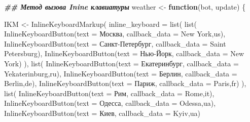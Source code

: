 \documentclass[
]{book}
\newenvironment{Shaded}{\begin{snugshade}}{\end{snugshade}}
\newcommand{\AttributeTok}[1]{\textcolor[rgb]{0.77,0.63,0.00}{#1}}
\newcommand{\ControlFlowTok}[1]{\textcolor[rgb]{0.13,0.29,0.53}{\textbf{#1}}}
\newcommand{\DocumentationTok}[1]{\textcolor[rgb]{0.56,0.35,0.01}{\textbf{\textit{#1}}}}
\newcommand{\FunctionTok}[1]{\textcolor[rgb]{0.00,0.00,0.00}{#1}}
\newcommand{\NormalTok}[1]{#1}
\newcommand{\OtherTok}[1]{\textcolor[rgb]{0.56,0.35,0.01}{#1}}
\newcommand{\StringTok}[1]{\textcolor[rgb]{0.31,0.60,0.02}{#1}}
\begin{document}
\begin{Shaded}
\begin{Highlighting}[]
\DocumentationTok{\#\# Метод вызова Inine клавиатуры}
\NormalTok{weather }\OtherTok{\textless{}{-}} \ControlFlowTok{function}\NormalTok{(bot, update) \{}

\NormalTok{  IKM }\OtherTok{\textless{}{-}} \FunctionTok{InlineKeyboardMarkup}\NormalTok{(}
    \AttributeTok{inline\_keyboard =} \FunctionTok{list}\NormalTok{(}
      \FunctionTok{list}\NormalTok{(}
        \FunctionTok{InlineKeyboardButton}\NormalTok{(}\AttributeTok{text =} \StringTok{\textquotesingle{}Москва\textquotesingle{}}\NormalTok{, }\AttributeTok{callback\_data =} \StringTok{\textquotesingle{}New York,us\textquotesingle{}}\NormalTok{),}
        \FunctionTok{InlineKeyboardButton}\NormalTok{(}\AttributeTok{text =} \StringTok{\textquotesingle{}Санкт{-}Петербург\textquotesingle{}}\NormalTok{, }\AttributeTok{callback\_data =} \StringTok{\textquotesingle{}Saint Petersburg\textquotesingle{}}\NormalTok{),}
        \FunctionTok{InlineKeyboardButton}\NormalTok{(}\AttributeTok{text =} \StringTok{\textquotesingle{}Нью{-}Йорк\textquotesingle{}}\NormalTok{, }\AttributeTok{callback\_data =} \StringTok{\textquotesingle{}New York\textquotesingle{}}\NormalTok{)}
\NormalTok{      ),}
      \FunctionTok{list}\NormalTok{(}
        \FunctionTok{InlineKeyboardButton}\NormalTok{(}\AttributeTok{text =} \StringTok{\textquotesingle{}Екатеринбург\textquotesingle{}}\NormalTok{, }\AttributeTok{callback\_data =} \StringTok{\textquotesingle{}Yekaterinburg,ru\textquotesingle{}}\NormalTok{),}
        \FunctionTok{InlineKeyboardButton}\NormalTok{(}\AttributeTok{text =} \StringTok{\textquotesingle{}Берлин\textquotesingle{}}\NormalTok{, }\AttributeTok{callback\_data =} \StringTok{\textquotesingle{}Berlin,de\textquotesingle{}}\NormalTok{),}
        \FunctionTok{InlineKeyboardButton}\NormalTok{(}\AttributeTok{text =} \StringTok{\textquotesingle{}Париж\textquotesingle{}}\NormalTok{, }\AttributeTok{callback\_data =} \StringTok{\textquotesingle{}Paris,fr\textquotesingle{}}\NormalTok{)}
\NormalTok{      ),}
      \FunctionTok{list}\NormalTok{(}
        \FunctionTok{InlineKeyboardButton}\NormalTok{(}\AttributeTok{text =} \StringTok{\textquotesingle{}Рим\textquotesingle{}}\NormalTok{, }\AttributeTok{callback\_data =} \StringTok{\textquotesingle{}Rome,it\textquotesingle{}}\NormalTok{),}
        \FunctionTok{InlineKeyboardButton}\NormalTok{(}\AttributeTok{text =} \StringTok{\textquotesingle{}Одесса\textquotesingle{}}\NormalTok{, }\AttributeTok{callback\_data =} \StringTok{\textquotesingle{}Odessa,ua\textquotesingle{}}\NormalTok{),}
        \FunctionTok{InlineKeyboardButton}\NormalTok{(}\AttributeTok{text =} \StringTok{\textquotesingle{}Киев\textquotesingle{}}\NormalTok{, }\AttributeTok{callback\_data =} \StringTok{\textquotesingle{}Kyiv,ua\textquotesingle{}}\NormalTok{)}

\end{Highlighting}
\end{Shaded}
\end{document}
